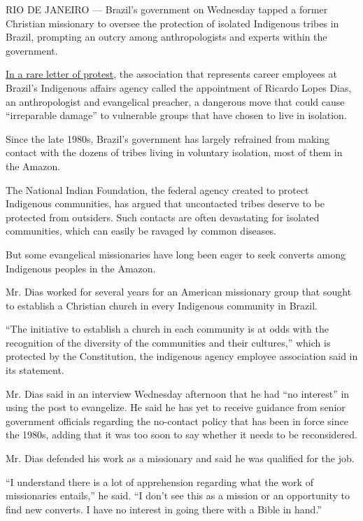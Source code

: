 RIO DE JANEIRO --- Brazil's government on Wednesday tapped a former
Christian missionary to oversee the protection of isolated Indigenous
tribes in Brazil, prompting an outcry among anthropologists and experts
within the government.

\href{https://indigenistasassociados.org.br/2020/02/03/risco-iminente-coordenacao-de-indios-isolados-deve-ter-experiencia-na-area/}{In
a rare letter of protest}, the association that represents career
employees at Brazil's Indigenous affairs agency called the appointment
of Ricardo Lopes Dias, an anthropologist and evangelical preacher, a
dangerous move that could cause ``irreparable damage'' to vulnerable
groups that have chosen to live in isolation.

Since the late 1980s, Brazil's government has largely refrained from
making contact with the dozens of tribes living in voluntary isolation,
most of them in the Amazon.

The National Indian Foundation, the federal agency created to protect
Indigenous communities, has argued that uncontacted tribes deserve to be
protected from outsiders. Such contacts are often devastating for
isolated communities, which can easily be ravaged by common diseases.

But some evangelical missionaries have long been eager to seek converts
among Indigenous peoples in the Amazon.

Mr. Dias worked for several years for an American missionary group that
sought to establish a Christian church in every Indigenous community in
Brazil.

``The initiative to establish a church in each community is at odds with
the recognition of the diversity of the communities and their
cultures,'' which is protected by the Constitution, the indigenous
agency employee association said in its statement.

Mr. Dias said in an interview Wednesday afternoon that he had ``no
interest'' in using the post to evangelize. He said he has yet to
receive guidance from senior government officials regarding the
no-contact policy that has been in force since the 1980s, adding that it
was too soon to say whether it needs to be reconsidered.

Mr. Dias defended his work as a missionary and said he was qualified for
the job.

``I understand there is a lot of apprehension regarding what the work of
missionaries entails,'' he said. ``I don't see this as a mission or an
opportunity to find new converts. I have no interest in going there with
a Bible in hand.''

